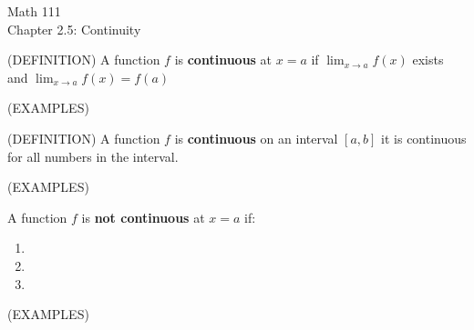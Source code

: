 \documentclass[11pt]{article}
\begin{document}
\begin{center}
\Large
\rm{Math 111}
\\
\rm{Chapter 2.5:  Continuity}
\\
\end{center}
\vspace{0.2in}

(DEFINITION)  A function $f$ is {\bf continuous} at $x=a$ if $\lim_{x\to a}f(x) $ exists and $\lim_{x\to a}f(x)=f(a)$
\vspace{1in}

(EXAMPLES)\\

\vspace{1in}

(DEFINITION)  A function $f$ is {\bf continuous} on an interval $[a,b]$ it is continuous for all numbers in the interval.
\vspace{1in}

(EXAMPLES)\\

\vspace{1in}


A function $f$ is {\bf not continuous} at $x=a$ if:
\begin{enumerate}
\item{}

  \vspace{0.5in}

  

\item{}

    \vspace{0.5in}

  
\item{}

    \vspace{0.5in}


  \end{enumerate}

\pagebreak

    (EXAMPLES)\\
\end{document}
